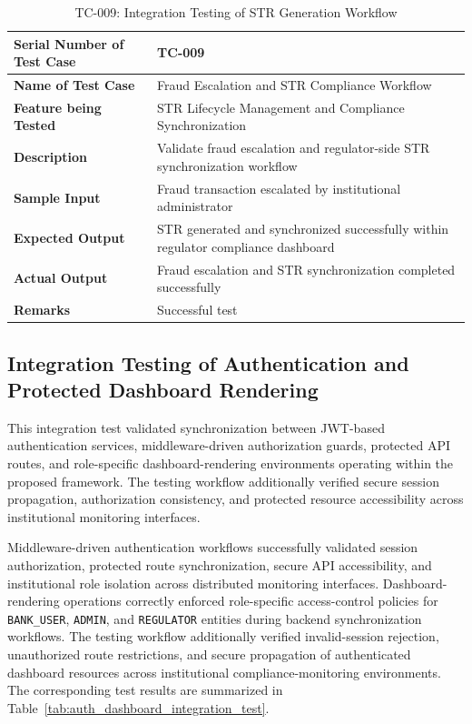 \begin{table}[H]
\centering
\caption{TC-009: Integration Testing of STR Generation Workflow}
\label{tab:str_generation_integration_test}
\vspace{0.2cm}

\begin{tabular}{|p{4.2cm}|p{9cm}|}
\hline
\textbf{Serial Number of Test Case} & TC-009 \\ \hline
\textbf{Name of Test Case} & Fraud Escalation and STR Compliance Workflow \\ \hline
\textbf{Feature being Tested} & STR Lifecycle Management and Compliance Synchronization \\ \hline
\textbf{Description} & Validate fraud escalation and regulator-side STR synchronization workflow \\ \hline
\textbf{Sample Input} & Fraud transaction escalated by institutional administrator \\ \hline
\textbf{Expected Output} & STR generated and synchronized successfully within regulator compliance dashboard \\ \hline
\textbf{Actual Output} & Fraud escalation and STR synchronization completed successfully \\ \hline
\textbf{Remarks} & Successful test \\ \hline
\end{tabular}
\end{table}

\renewcommand{\arraystretch}{1}

\subsection[Integration Testing of Authentication and Protected Dashboard Rendering]{\textbf{Integration Testing of Authentication and Protected Dashboard Rendering}}

This integration test validated synchronization between JWT-based authentication services, middleware-driven authorization guards, protected API routes, and role-specific dashboard-rendering environments operating within the proposed framework. The testing workflow additionally verified secure session propagation, authorization consistency, and protected resource accessibility across institutional monitoring interfaces.

Middleware-driven authentication workflows successfully validated session authorization, protected route synchronization, secure API accessibility, and institutional role isolation across distributed monitoring interfaces. Dashboard-rendering operations correctly enforced role-specific access-control policies for \texttt{BANK\_USER}, \texttt{ADMIN}, and \texttt{REGULATOR} entities during backend synchronization workflows. The testing workflow additionally verified invalid-session rejection, unauthorized route restrictions, and secure propagation of authenticated dashboard resources across institutional compliance-monitoring environments. The corresponding test results are summarized in Table~\ref{tab:auth_dashboard_integration_test}.
\renewcommand{\arraystretch}{1.3}

